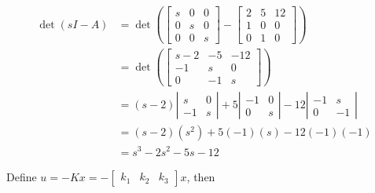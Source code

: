 \documentclass[main.tex]{subfiles}
\begin{document}
\begin{enumerate}
\begin{enumerate}
        $$
        \begin{aligned}
        \operatorname{det}(s I-A) &= \operatorname{det}\left(\left[\begin{array}{ccc}
        s & 0 & 0 \\
        0 & s & 0 \\
        0 & 0 & s
        \end{array}\right] - \left[\begin{array}{ccc}
        2 & 5 & 12 \\
        1 & 0 & 0 \\
        0 & 1 & 0
        \end{array}\right] \right)\\
        &= \operatorname{det}\left(\left[\begin{array}{ccc}
        s-2 & -5 & -12 \\
        -1 & s & 0 \\
        0 & -1 & s
        \end{array}\right] \right)\\
        & =(s-2)\left|\begin{array}{cc}
        s & 0 \\
        -1 & s
        \end{array}\right|+5\left|\begin{array}{cc}
        -1 & 0 \\
        0 & s
        \end{array}\right|-12 \left|\begin{array}{cc}
        -1 & s \\
        0 & -1
        \end{array}\right|\\
        & =(s-2)\left(s^2\right)+5(-1)(s)-12(-1)(-1) \\
        & =s^3-2 s^2-5 s - 12
        \end{aligned}
        $$

        Define $u= -K x = -\left[\begin{array}{lll}k_1 & k_2 & k_3 \end{array}\right] x$, then
        

\end{enumerate}
\end{enumerate}
\end{document}
